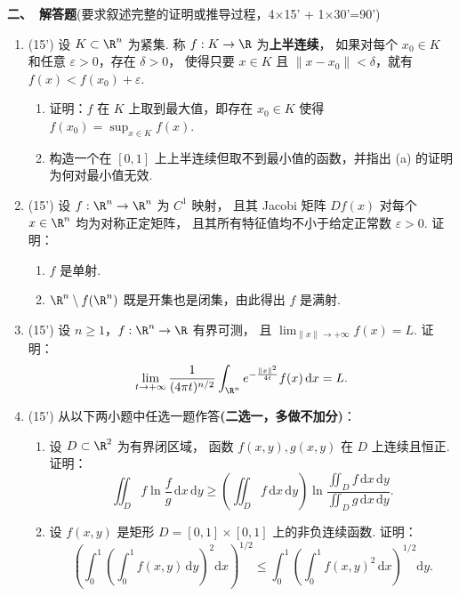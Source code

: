 \textbf{二、\ 解答题}(要求叙述完整的证明或推导过程，4$\times$15' + 1$\times$30'=90')
\begin{enumerate}
\item (15') 设 \(K\subset\R^n\) 为紧集. 称 \(f:K\to\R\) 为\textbf{上半连续}，
如果对每个 \(x_0\in K\) 和任意 \(\varepsilon>0\)，存在 \(\delta>0\)，
使得只要 \(x\in K\) 且 \(\|x-x_0\|<\delta\)，就有 $f(x)<f(x_0)+\varepsilon$.
\begin{enumerate}
\item[(a)]证明：\(f\) 在 \(K\) 上取到最大值，即存在 \(x_0\in K\) 使得 $\displaystyle f(x_0)=\sup_{x\in K}f(x)$.
\item[(b)] 构造一个在 \([0,1]\) 上上半连续但取不到最小值的函数，并指出 (a) 的证明为何对最小值无效.
\end{enumerate}

\item (15') 设 \(f:\R^n\to\R^n\) 为 \(C^1\) 映射，
且其 Jacobi 矩阵 \(Df(x)\) 对每个 \(x\in\R^n\) 均为对称正定矩阵，
且其所有特征值均不小于给定正常数 \(\varepsilon>0\). 证明：
\begin{enumerate}
\item[(a)] \(f\) 是单射.
\item[(b)] \(\R^n\setminus f(\R^n)\) 既是开集也是闭集，由此得出 \(f\) 是满射.
\end{enumerate}

\item (15') 设 \(n\ge1\)，\(f:\R^n\to\R\) 有界可测，
且 $\displaystyle\lim_{\|x\|\to+\infty}f(x)=L$. 证明：
\[
\lim_{t\to+\infty}
\frac{1}{(4\pi t)^{n/2}}
\int_{\R^n}e^{-\frac{\|x\|^2}{4t}}f(x)\,\mathrm{d} x=L.
\]

\item (15') 从以下两小题中任选一题作答\textbf{(二选一，多做不加分)}：
\begin{enumerate}
\item[(A)]设 \(D\subset\R^2\) 为有界闭区域，
函数 \(f(x,y),g(x,y)\) 在 \(D\) 上连续且恒正. 证明：
\[
\iint_D f\ln\frac{f}{g}\,\mathrm{d}x\,\mathrm{d}y
\ge\left(\iint_D f\,\mathrm{d}x\,\mathrm{d}y\right)
\ln\frac{\displaystyle\iint_D f\,\mathrm{d}x\,\mathrm{d}y}
{\displaystyle\iint_D g\,\mathrm{d}x\,\mathrm{d}y}.
\]
\item[(B)]设 \(f(x,y)\) 是矩形 \(D=[0,1]\times[0,1]\) 上的非负连续函数. 证明：
\[
\left(\int_0^1\left(\int_0^1 f(x,y)\,\mathrm{d}y\right)^2\mathrm{d}x\right)^{1/2}
\le\int_0^1\left(\int_0^1f(x,y)^2\,\mathrm{d}x\right)^{1/2}\mathrm{d}y.
\]
\end{enumerate}


\end{enumerate}
